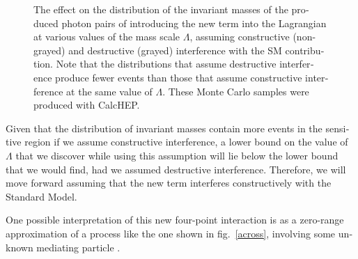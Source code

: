 \begin{english}
\begin{new}
\begin{figure}[htp]
\begin{minipage}[b]{.69\textwidth}
\begin{infilsf} \tiny \makebox[0pt][l]{
\hspace{-1em}
}\end{infilsf} \end{minipage}
\hfill\begin{minipage}[b]{.3\textwidth}
\caption{The effect on the distribution of the invariant masses of the produced photon pairs of introducing the new term into the Lagrangian at various values of the mass scale $\Lambda$, assuming constructive (non-grayed) and destructive (grayed) interference with the SM contribution. Note that the distributions that assume destructive interference produce fewer events than those that assume constructive interference at the same value of $\Lambda$. These Monte Carlo samples were produced with CalcHEP.
\label{interf}}
\end{minipage}
\end{figure}

Given that the distribution of invariant masses contain more events in the sensitive region if we assume constructive interference, a lower bound on the value of $\Lambda$ that we discover while using this assumption will lie below the lower bound that we would find, had we assumed destructive interference. Therefore, we will move forward assuming that the new term interferes constructively with the Standard Model.
\end{new}

One possible interpretation of this new four-point interaction is as a zero-range approximation of a process like the one shown in fig.~\ref{across}, involving some unknown mediating particle \cite{marshaw:zerorange}.


\end{english}
